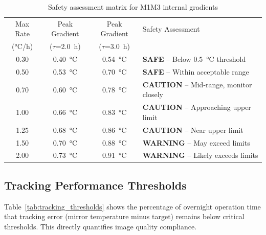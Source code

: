 \documentclass[11pt,a4paper]{article}
\begin{document}
\begin{table}[H]
\centering
\caption{Safety assessment matrix for M1M3 internal gradients}
\label{tab:safety_matrix}
\begin{tabular}{@{}cccl@{}}
\toprule
Max Rate & Peak Gradient & Peak Gradient & Safety Assessment \\
(\si{\celsius/h}) & ($\tau$=\SI{2.0}{h}) & ($\tau$=\SI{3.0}{h}) & \\
\midrule
0.30 & \SI{0.40}{\celsius} & \SI{0.54}{\celsius} & \textcolor{safegreen}{\textbf{SAFE}} -- Below \SI{0.5}{\celsius} threshold \\
0.50 & \SI{0.53}{\celsius} & \SI{0.70}{\celsius} & \textcolor{safegreen}{\textbf{SAFE}} -- Within acceptable range \\
\rowcolor{yellow!20} 0.70 & \SI{0.60}{\celsius} & \SI{0.78}{\celsius} & \textcolor{warningorange}{\textbf{CAUTION}} -- Mid-range, monitor closely \\
1.00 & \SI{0.66}{\celsius} & \SI{0.83}{\celsius} & \textcolor{warningorange}{\textbf{CAUTION}} -- Approaching upper limit \\
1.25 & \SI{0.68}{\celsius} & \SI{0.86}{\celsius} & \textcolor{warningorange}{\textbf{CAUTION}} -- Near upper limit \\
1.50 & \SI{0.70}{\celsius} & \SI{0.88}{\celsius} & \textcolor{dangerred}{\textbf{WARNING}} -- May exceed limits \\
2.00 & \SI{0.73}{\celsius} & \SI{0.91}{\celsius} & \textcolor{dangerred}{\textbf{WARNING}} -- Likely exceeds limits \\
\bottomrule
\end{tabular}
\end{table}

\subsection{Tracking Performance Thresholds}

Table~\ref{tab:tracking_thresholds} shows the percentage of overnight operation time that tracking error (mirror temperature minus target) remains below critical thresholds. This directly quantifies image quality compliance.
\end{document}
